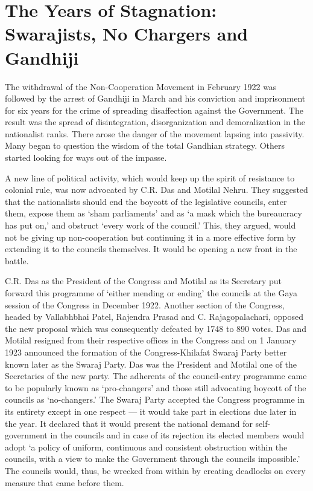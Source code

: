 \chapter[The Years of Stagnation]{The Years of Stagnation: Swarajists, No Chargers and Gandhiji}
\begin{multicols}{2}

The withdrawal of the Non-Cooperation Movement in February 1922 was followed by the arrest of Gandhiji in March and his conviction and imprisonment for six years for the crime of spreading disaffection against the Government. The result was the spread of disintegration, disorganization and demoralization in the nationalist ranks. There arose the danger of the movement lapsing into passivity. Many began to question the wisdom of the total Gandhian strategy. Others started looking for ways out of the impasse.

A new line of political activity, which would keep up the spirit of resistance to colonial rule, was now advocated by C.R. Das and Motilal Nehru. They suggested that the nationalists should end the boycott of the legislative councils, enter them, expose them as `sham parliaments' and as `a mask which the bureaucracy has put on,' and obstruct `every work of the council.' This, they argued, would not be giving up non-cooperation but continuing it in a more effective form by extending it to the councils themselves. It would be opening a new front in the battle.

C.R. Das as the President of the Congress and Motilal as its Secretary put forward this programme of `either mending or ending' the councils at the Gaya session of the Congress in December 1922. Another section of the Congress, headed by Vallabhbhai Patel, Rajendra Prasad and C. Rajagopalachari, opposed the new proposal which was consequently defeated by 1748 to 890 votes. Das and Motilal resigned from their respective offices in the Congress and on 1 January 1923 announced the formation of the Congress-Khilafat Swaraj Party better known later as the Swaraj Party. Das was the President and Motilal one of the Secretaries of the new party. The adherents of the council-entry programme came to be popularly known as `pro-changers' and those still advocating boycott of the councils as `no-changers.' The Swaraj Party accepted the Congress programme in its entirety except in one respect --- it would take part in elections due later in the year. It declared that it would present the national demand for self-government in the councils and in case of its rejection its elected members would adopt `a policy of uniform, continuous and consistent obstruction within the councils, with a view to make the Government through the councils impossible.' The councils would, thus, be wrecked from within by creating deadlocks on every measure that came before them.


\end{multicols}
